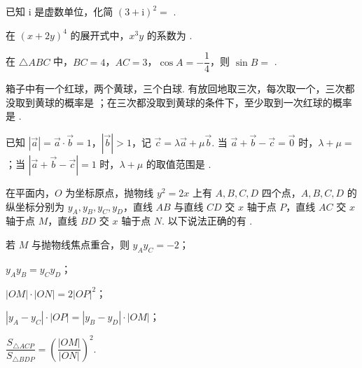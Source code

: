 \documentclass[a4paper,11pt]{report}
\begin{document}
\begin{examquestions}[start=10]
\item 已知 $\mathrm{i}$ 是虚数单位，化简 $(3+\mathrm{i})^2=$ \blank.

\item 在 $(x+2y)^4$ 的展开式中，$x^3y$ 的系数为 \blank.

\item 在 $\triangle ABC$ 中，$BC=4$，$AC=3$，$\cos A=-\dfrac14$，则 $\sin B=$ \blank.

\item 箱子中有一个红球，两个黄球，三个白球. 有放回地取三次，每次取一个，三次都没取到黄球的概率是 \blank；在三次都没取到黄球的条件下，至少取到一次红球的概率是 \blank.

\item 已知 $|\vec a|=\vec a\cdot\vec b=1$，$|\vec b|>1$，记 $\vec c=\lambda\vec a+\mu\vec b$. 当 $\vec a+\vec b-\vec c=\vec0$ 时，$\lambda+\mu=$ \blank；当 $|\vec a+\vec b-\vec c|=1$ 时，$\lambda+\mu$ 的取值范围是 \blank.

\item 在平面内，$O$ 为坐标原点，抛物线 $y^2=2x$ 上有 $A,B,C,D$ 四个点，$A,B,C,D$ 的纵坐标分别为 $y_A,y_B,y_C,y_D$，直线 $AB$ 与直线 $CD$ 交 $x$ 轴于点 $P$，直线 $AC$ 交 $x$ 轴于点 $M$，直线 $BD$ 交 $x$ 轴于点 $N$. 以下说法正确的有 \blank.

 若 $M$ 与抛物线焦点重合，则 $y_Ay_C=-2$；

 $y_Ay_B=y_Cy_D$；

 $|OM|\cdot|ON|=2|OP|^2$；

 $|y_A-y_C|\cdot|OP|=|y_B-y_D|\cdot|OM|$；

 $\dfrac{S_{\triangle ACP}}{S_{\triangle BDP}}=\left(\dfrac{|OM|}{|ON|}\right)^2$.
\end{examquestions}
\end{document}
